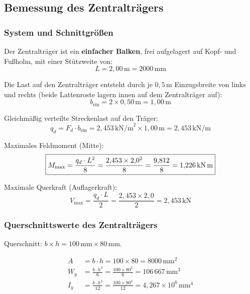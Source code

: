 ﻿\documentclass[12pt,a4paper]{article}
\theoremstyle{definition}
\theoremstyle{plain}
\theoremstyle{remark}
\begin{document}
\subsection{Bemessung des Zentralträgers}

\subsubsection{System und Schnittgrößen}

Der Zentralträger ist ein \textbf{einfacher Balken}, frei aufgelagert auf Kopf- und
Fußholm, mit einer Stützweite von:
\begin{equation}
  L = 2{,}00\,\text{m} = 2000\,\text{mm}
\end{equation}

Die Last auf den Zentralträger entsteht durch je $0{,}5\,\text{m}$ Einzugsbreite
von links und rechts (beide Lattenroste lagern innen auf dem Zentralträger auf):
\begin{equation}
  b_{\text{ein}} = 2 \times 0{,}50\,\text{m} = 1{,}00\,\text{m}
\end{equation}

Gleichmäßig verteilte Streckenlast auf den Träger:
\begin{equation}
  \boxed{q_d = F_d \cdot b_{\text{ein}} = 2{,}453\,\text{kN/m}^2 \times 1{,}00\,\text{m}
  = 2{,}453\,\text{kN/m}}
\end{equation}

Maximales Feldmoment (Mitte):
\begin{equation}
  \boxed{M_{\max} = \frac{q_d \cdot L^2}{8} = \frac{2{,}453 \times 2{,}0^2}{8}
  = \frac{9{,}812}{8} = 1{,}226\,\text{kN\,m}}
\end{equation}

Maximale Querkraft (Auflagerkraft):
\begin{equation}
  \boxed{V_{\max} = \frac{q_d \cdot L}{2} = \frac{2{,}453 \times 2{,}0}{2}
  = 2{,}453\,\text{kN}}
\end{equation}

\subsubsection{Querschnittswerte des Zentralträgers}

Querschnitt: $b \times h = 100\,\text{mm} \times 80\,\text{mm}$.

\begin{align}
  A   &= b \cdot h = 100 \times 80 = 8000\,\text{mm}^2 \\
  W_y &= \frac{b \cdot h^2}{6} = \frac{100 \times 80^2}{6} = 106\,667\,\text{mm}^3 \\
  I_y &= \frac{b \cdot h^3}{12} = \frac{100 \times 80^3}{12} = 4{,}267 \times 10^6\,\text{mm}^4
\end{align}
\end{document}
